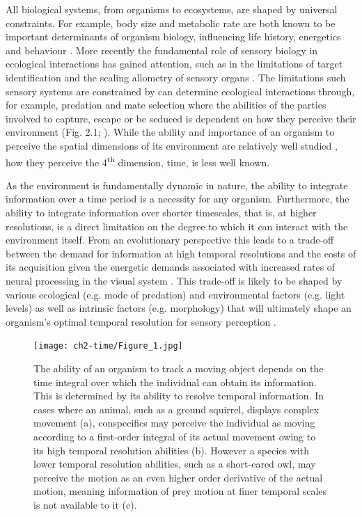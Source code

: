 All biological systems, from organisms to ecosystems, are shaped by universal constraints. For example, body size and metabolic rate are both known to be important determinants of organism biology, influencing life history, energetics and behaviour \citep{brown2004, woodward2005, sibly2012metabolic}. More recently the fundamental role of sensory biology in ecological interactions has gained attention, such as in the limitations of target identification \citep{tosh2010modelling} and the scaling allometry of sensory organs \citep{howland2004allometry,cronin2005role,garamszegi2002coevolving,kiltie2000scaling}. The limitations such sensory systems are constrained by can determine ecological interactions through, for example, predation and mate selection where the abilities of the parties involved to capture, escape or be seduced is dependent on how they perceive their environment (Fig. 2.1; \citealt{cronin2005role,clark2012field,hornstein2000sexual,stevens2007predator}). While the ability and importance of an organism to perceive the spatial dimensions of its environment are relatively well studied \citep{cronin2005role,clark2012field}, how they perceive the 4\textsuperscript{th} dimension, time, is less well known.

As the environment is fundamentally dynamic in nature, the ability to integrate information over a time period is a necessity for any organism. Furthermore, the ability to integrate information over shorter timescales, that is, at higher resolutions, is a direct limitation on the degree to which it can interact with the environment itself. From an evolutionary perspective this leads to a trade-off between the demand for information at high temporal resolutions and the costs of its acquisition given the energetic demands associated with increased rates of neural processing in the visual system \citep{laughlin2001energy}. This trade-off is likely to be shaped by various ecological (e.g. mode of predation) and environmental factors (e.g. light levels) as well as intrinsic factors (e.g. morphology) that will ultimately shape an organism's optimal temporal resolution for sensory perception \citep{autrum1958electrophysiological}.


\begin{figure}[p]
  \centering
  \texttt{[image: ch2-time/Figure\_1.jpg]}
  \caption[ ]{The ability of an organism to track a moving object depends on the time integral over which the individual can obtain its information. This is determined by its ability to resolve temporal information. In cases where an animal, such as a ground squirrel, displays complex movement (a), conspecifics may perceive the individual as moving according to a first-order integral of its actual movement owing to its high temporal resolution abilities (b). However a species with lower temporal resolution abilities, such as a short-eared owl, may perceive the motion as an even higher order derivative of the actual motion, meaning information of prey motion at finer temporal scales is not available to it (c).}
  \label{fig:Figure 2.1.}
\end{figure}


